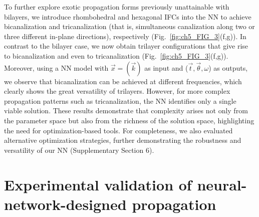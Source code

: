 To further explore exotic propagation forms previously unattainable with bilayers, we introduce rhombohedral and hexagonal IFCs into the NN to achieve bicanalization and tricanalization (that is, simultaneous canalization along two or three different in-plane directions), respectively (Fig.~\ref{fig:ch5_FIG_3}(f,g)). In contrast to the bilayer case, we now obtain trilayer configurations that give rise to bicanalization and even to tricanalization (Fig.~\ref{fig:ch5_FIG_3}(f,g)). Moreover, using a NN model with $\vec{x}=(\vec{k})$ as input and ($\vec{t},\vec{\theta},\omega$) as outputs, we observe that bicanalization can be achieved at different frequencies, which clearly shows the great versatility of trilayers. However, for more complex propagation patterns such as tricanalization, the NN identifies only a single viable solution. These results demonstrate that complexity arises not only from the parameter space but also from the richness of the solution space, highlighting the need for optimization-based tools. For completeness, we also evaluated alternative optimization strategies, further demonstrating the robustness and versatility of our NN (Supplementary Section 6).


\section{Experimental validation of neural-network-designed propagation}\label{sec:ch5_experiment}

